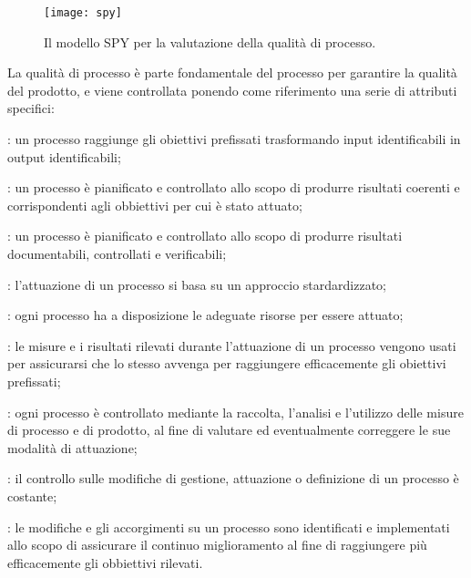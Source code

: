 \begin{figure}[h]
\centering
\texttt{[image: spy]}
\caption{Il modello SPY per la valutazione della qualità di processo.}\label{fig:spy}
\end{figure}

La qualità di processo è parte fondamentale del processo per garantire la qualità del prodotto, e viene controllata ponendo come riferimento una serie di attributi specifici:

\begin{description}
\item {}: un processo raggiunge gli obiettivi prefissati trasformando input identificabili in output identificabili;

\item {}: un processo è pianificato e controllato allo scopo di produrre risultati coerenti e corrispondenti agli obbiettivi per cui è stato attuato;

\item {}: un processo è pianificato e controllato allo scopo di produrre risultati documentabili, controllati e verificabili;

\item {}: l'attuazione di un processo si basa su un approccio stardardizzato;

\item {}: ogni processo ha a disposizione le adeguate risorse per essere attuato;

\item {}: le misure e i risultati rilevati durante l'attuazione di un processo vengono usati per assicurarsi che lo stesso avvenga per raggiungere efficacemente gli obiettivi prefissati;

\item {}: ogni processo è controllato mediante la raccolta, l'analisi e l'utilizzo delle misure di processo e di prodotto, al fine di valutare ed eventualmente correggere le sue modalità di attuazione;

\item {}: il controllo sulle modifiche di gestione, attuazione o definizione di un processo è costante;

\item {}: le modifiche e gli accorgimenti su un processo sono identificati e implementati allo scopo di assicurare il continuo miglioramento al fine di raggiungere più efficacemente gli obbiettivi rilevati.
\end{description}

